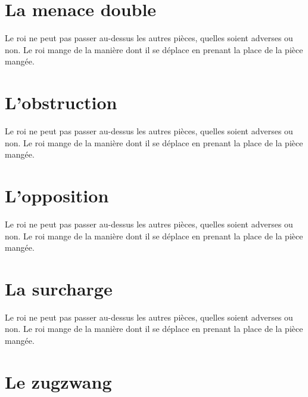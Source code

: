 \documentclass[a5paper,openany,twocolumn]{book}%
\begin{document}

\chapter{La menace double}

Le roi ne peut pas passer au-dessus les autres pièces, quelles soient adverses ou non. Le roi mange de la manière dont il se déplace en prenant la place de la pièce mangée. 


\chapter{L'obstruction}

Le roi ne peut pas passer au-dessus les autres pièces, quelles soient adverses ou non. Le roi mange de la manière dont il se déplace en prenant la place de la pièce mangée. 


\chapter{L'opposition}

Le roi ne peut pas passer au-dessus les autres pièces, quelles soient adverses ou non. Le roi mange de la manière dont il se déplace en prenant la place de la pièce mangée. 


\chapter{La surcharge}

Le roi ne peut pas passer au-dessus les autres pièces, quelles soient adverses ou non. Le roi mange de la manière dont il se déplace en prenant la place de la pièce mangée. 


\chapter{Le zugzwang}
\end{document}
